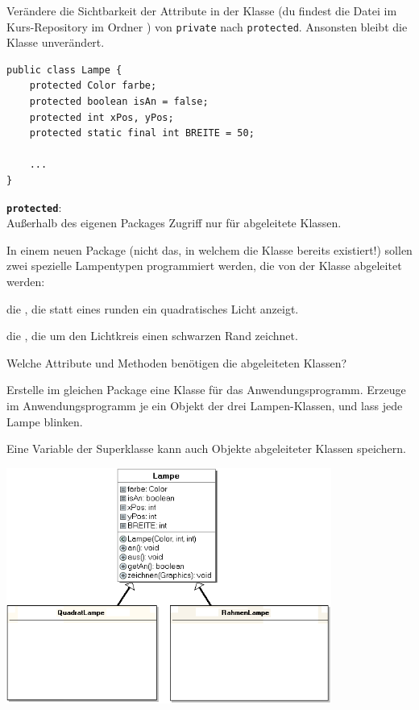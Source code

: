 \begin{compactenum}[a)]
\item Verändere die Sichtbarkeit der Attribute in der Klasse 
(du findest die Datei  im Kurs-Repository im Ordner
) von \verb|private| nach \verb|protected|.
Ansonsten bleibt die Klasse  unverändert.

\begin{minipage}{0.5\textwidth}
\begin{lstlisting}
public class Lampe {
    protected Color farbe;
    protected boolean isAn = false;
    protected int xPos, yPos;
    protected static final int BREITE = 50;

    ...
}
\end{lstlisting}
\end{minipage}
\hfill
\begin{minipage}{0.4\textwidth}
\textbf{\lstinline|protected|}:\\ Außerhalb des eigenen Packages Zugriff nur für
abgeleitete Klassen.
\end{minipage}

\item In einem neuen Package (nicht das, in welchem die Klasse 
bereits existiert!) sollen zwei spezielle Lampentypen programmiert werden, die
von der Klasse  abgeleitet werden:

\begin{compactenum}[1.]
\item die , die statt eines runden ein quadratisches Licht
anzeigt.
\item die , die um den Lichtkreis einen schwarzen Rand
zeichnet.
\end{compactenum}

Welche Attribute und Methoden benötigen die abgeleiteten Klassen?

\item Erstelle im gleichen Package eine Klasse für das Anwendungsprogramm.
Erzeuge im Anwendungsprogramm je ein Objekt der drei Lampen-Klassen, und lass
jede Lampe blinken.

\item Eine Variable der Superklasse  kann auch Objekte
abgeleiteter Klassen speichern.

\includegraphics[width=0.8\textwidth]{./inf/SEKII/16_Java_Vererbung/Aufgabe3.png}


\end{compactenum}
